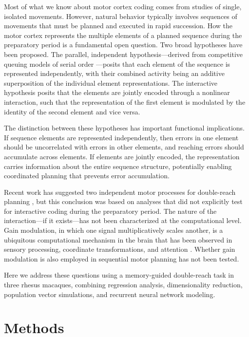 \documentclass[12pt]{article}
\begin{document}
Most of what we know about motor cortex coding comes from studies of single, isolated movements. However, natural behavior typically involves sequences of movements that must be planned and executed in rapid succession. How the motor cortex represents the multiple elements of a planned sequence during the preparatory period is a fundamental open question. Two broad hypotheses have been proposed. The parallel, independent hypothesis---derived from competitive queuing models of serial order \citep{averbeck2002parallel, bullock2004neural}---posits that each element of the sequence is represented independently, with their combined activity being an additive superposition of the individual element representations. The interactive hypothesis posits that the elements are jointly encoded through a nonlinear interaction, such that the representation of the first element is modulated by the identity of the second element and vice versa.

The distinction between these hypotheses has important functional implications. If sequence elements are represented independently, then errors in one element should be uncorrelated with errors in other elements, and reaching errors should accumulate across elements. If elements are jointly encoded, the representation carries information about the entire sequence structure, potentially enabling coordinated planning that prevents error accumulation.

Recent work has suggested two independent motor processes for double-reach planning \citep{cisek2005neural}, but this conclusion was based on analyses that did not explicitly test for interactive coding during the preparatory period. The nature of the interaction---if it exists---has not been characterized at the computational level. Gain modulation, in which one signal multiplicatively scales another, is a ubiquitous computational mechanism in the brain that has been observed in sensory processing, coordinate transformations, and attention \citep{salinas2000gain}. Whether gain modulation is also employed in sequential motor planning has not been tested.

Here we address these questions using a memory-guided double-reach task in three rhesus macaques, combining regression analysis, dimensionality reduction, population vector simulations, and recurrent neural network modeling.

\section{Methods}
\end{document}
